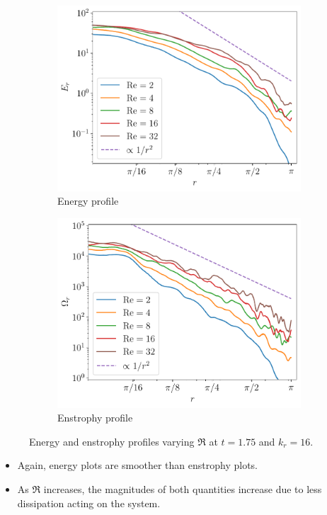 \documentclass{beamer} %
\begin{document}
\begin{frame}
	\begin{figure}[!ht]
		\begin{subfigure}{0.44\textwidth}
			\centering
			\includegraphics[width=\textwidth]{../images/Energy_Re.kdn16.175.pdf}
			\caption{Energy profile}
		\end{subfigure}\hspace{0.04\textwidth}
		\begin{subfigure}{0.44\textwidth}
			\centering
			\includegraphics[width=\textwidth]{../images/Enstrophy_Re.kdn16.175.pdf}
			\caption{Enstrophy profile}
		\end{subfigure}
		\caption{Energy and enstrophy profiles varying $\Re$ at $t=1.75$ and $k_r=16$.}
	\end{figure}
	\begin{itemize}
		\item Again, energy plots are smoother than enstrophy plots.
		\item As $\Re$ increases, the magnitudes of both quantities increase due to less dissipation acting on the system.
	\end{itemize}
\end{frame}
\end{document}
